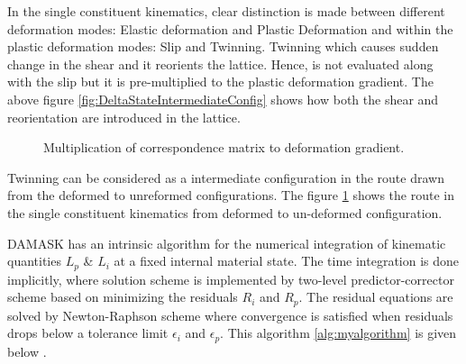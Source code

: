 In the single constituent kinematics, clear distinction is made between different deformation modes: Elastic deformation and Plastic Deformation and within the plastic deformation modes: Slip and Twinning. Twinning which causes sudden change in the shear and it reorients the lattice. Hence, is not evaluated along with the slip but it is pre-multiplied to the plastic deformation gradient. The above figure \ref{fig:DeltaStateIntermediateConfig} shows how both the shear and reorientation are introduced in the lattice.

\begin{figure}[H]
    \centering
    \fbox{\resizebox{0.6\textwidth}{!}{
    }}
    \caption{Multiplication of correspondence matrix to deformation gradient.}
    \label{fig:Twinning kinematics}
\end{figure}

Twinning can be considered as a intermediate configuration in the route drawn from the deformed to unreformed configurations. The figure \ref{fig:Twinning kinematics} shows the route in the single constituent kinematics from deformed to un-deformed configuration.

DAMASK has an intrinsic algorithm for the numerical integration of kinematic quantities $L_p$ \& $L_i$ at a fixed internal material state. The time integration is done implicitly, where solution scheme is implemented by two-level predictor-corrector scheme based on minimizing the residuals $R_i$ and $R_p$. The residual equations are solved by Newton-Raphson scheme where convergence is satisfied when residuals drops below a tolerance limit $\epsilon_i$ and $\epsilon_p$. This algorithm \ref{alg:myalgorithm} is given below .

